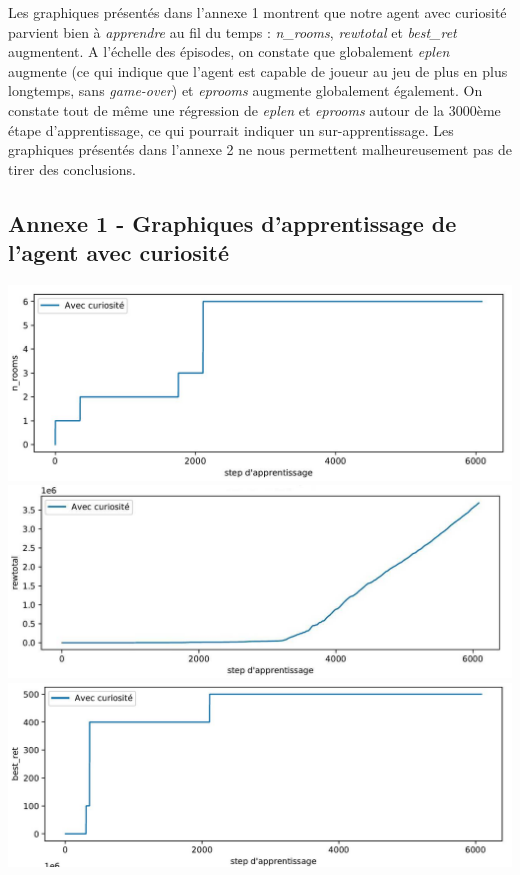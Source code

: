 \documentclass[a4paper,12pt]{report}
\begin{document}
\indent Les graphiques présentés dans l'annexe 1 montrent que notre agent avec curiosité parvient bien à \textit{apprendre} au fil du temps : \textit{n\_rooms}, \textit{rewtotal} et \textit{best\_ret} augmentent. A l'échelle des épisodes, on constate que globalement \textit{eplen} augmente (ce qui indique que l'agent est capable de joueur au jeu de plus en plus longtemps, sans \textit{game-over}) et \textit{eprooms} augmente globalement également. On constate tout de même une régression de \textit{eplen} et \textit{eprooms} autour de la 3000ème étape d'apprentissage, ce qui pourrait indiquer un sur-apprentissage. Les graphiques présentés dans l'annexe 2 ne nous permettent malheureusement pas de tirer des conclusions.

\newpage
\subsection*{Annexe 1 - Graphiques d'apprentissage de l'agent avec curiosité}
\label{annexe_1}
    \centering
    \includegraphics[width=\textwidth]{curiosity_only/curiosity_n_rooms.JPG}
    \includegraphics[width=\textwidth]{curiosity_only/curiosity_rewtotal.JPG}
    \includegraphics[width=\textwidth]{curiosity_only/curiosity_best_ret.JPG}
\end{document}
